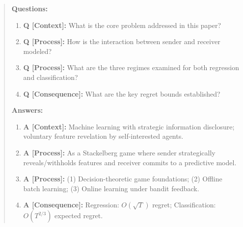 \documentclass[acmsmall]{acmart}
\newenvironment{faqblock}{%
  \par\medskip\noindent\begin{quote}\small\sffamily\slshape\color{humanifycolor}%
  \textbf{\upshape [Humanify Guide: FAQ]}\par
  \textbf{\upshape Questions:}\begin{enumerate}
}{%
  \end{enumerate}\end{quote}\medskip
}
\newcommand{\faqanswers}{%
  \end{enumerate}\par\textbf{\upshape Answers:}\begin{enumerate}
}
\newcommand{\faqitem}[2]{\item \textbf{\upshape Q [#1]:} #2}
\newcommand{\faqans}[2]{\item \textbf{\upshape A [#1]:} #2}
\begin{document}
\begin{faqblock}
\faqitem{Context}{What is the core problem addressed in this paper?}
\faqitem{Process}{How is the interaction between sender and receiver modeled?}
\faqitem{Process}{What are the three regimes examined for both regression and classification?}
\faqitem{Consequence}{What are the key regret bounds established?}
\faqanswers
\faqans{Context}{Machine learning with strategic information disclosure; voluntary feature revelation by self-interested agents.}
\faqans{Process}{As a Stackelberg game where sender strategically reveals/withholds features and receiver commits to a predictive model.}
\faqans{Process}{(1) Decision-theoretic game foundations; (2) Offline batch learning; (3) Online learning under bandit feedback.}
\faqans{Consequence}{Regression: $O(\sqrt{T})$ regret; Classification: $O(T^{2/3})$ expected regret.}
\end{faqblock}

\begin{abstract}
We investigate the framework of machine learning in the presence of strategic information disclosure, specifically focusing on the problem of voluntary feature revelation. This scenario is modeled as a Stackelberg game: a data provider (the sender) strategically determines whether to reveal or withhold optional features to optimize their individual payoff, while a decision-maker (the receiver) commits to a predictive model designed to minimize strategic prediction error. We analyze this interaction across two fundamental prediction spaces: continuous labels (regression) and discrete labels (multiclass classification). For both settings, we examine three sequential regimes of interaction: (i) the decision-theoretic game foundations, establishing necessary and sufficient conditions under which voluntary disclosure benefits the receiver; (ii) the offline batch learning problem, deriving uniform generalization bounds and sample complexity rates under finite training data; and (iii) the online learning problem, designing algorithms to learn under partial or bandit feedback in real-time. Since optimizing the discontinuous, step-like strategic risk is computationally intractable (NP-hard), we leverage smooth surrogate loss formulations to construct gradient-based optimization routines with rigorous regret guarantees—proving $O(\sqrt{T})$ regret for regression and $O(T^{2/3})$ expected regret for classification. Our theoretical findings are validated through comprehensive simulations, mapping out strategic advantage regions and confirming the empirical convergence rates under varying environment dynamics.
\end{abstract}
\end{document}
